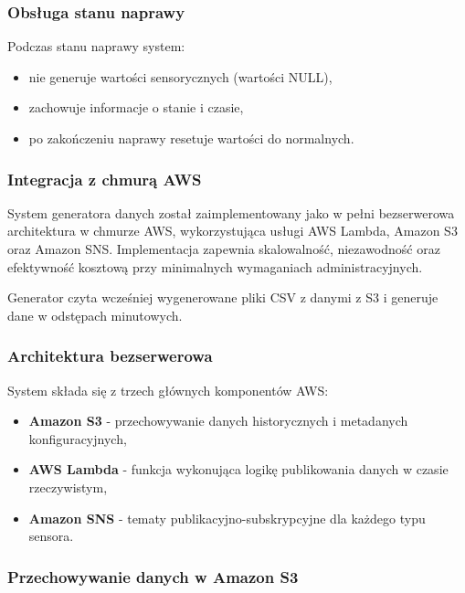 \subsubsection{Obsługa stanu naprawy}

Podczas stanu naprawy system:
\begin{itemize}
    \item nie generuje wartości sensorycznych (wartości NULL),
    \item zachowuje informacje o stanie i czasie,
    \item po zakończeniu naprawy resetuje wartości do normalnych.
\end{itemize}

\subsubsection{Integracja z chmurą AWS}
\label{sec:integracja_aws}

System generatora danych został zaimplementowany jako w pełni bezserwerowa architektura w chmurze AWS, wykorzystująca usługi AWS Lambda, Amazon S3 oraz Amazon SNS. Implementacja zapewnia skalowalność, niezawodność oraz efektywność kosztową przy minimalnych wymaganiach administracyjnych.

Generator czyta wcześniej wygenerowane pliki CSV z danymi z S3 i generuje dane w odstępach minutowych.

\subsubsection{Architektura bezserwerowa}
\label{subsec:architektura_bezserwerowa}

System składa się z trzech głównych komponentów AWS:

\begin{itemize}
    \item \textbf{Amazon S3} - przechowywanie danych historycznych i metadanych konfiguracyjnych,
    \item \textbf{AWS Lambda} - funkcja wykonująca logikę publikowania danych w czasie rzeczywistym,
    \item \textbf{Amazon SNS} - tematy publikacyjno-subskrypcyjne dla każdego typu sensora.
\end{itemize}

\subsubsection{Przechowywanie danych w Amazon S3}
\label{subsec:amazon_s3}

